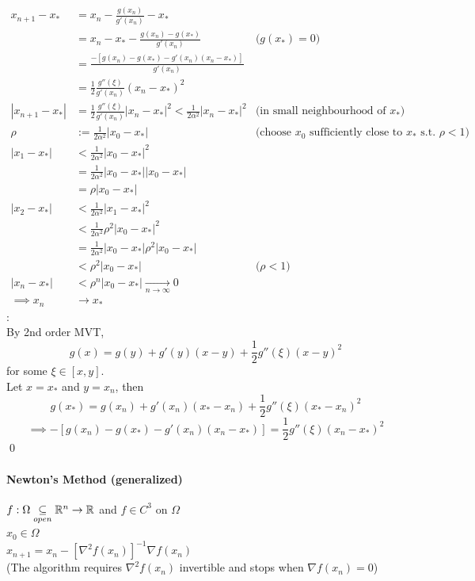 \documentclass[11pt]{article}
\begin{document}
\begin{align}
	x_{n+1} - x_* &= x_n - \frac{g(x_n)}{g'(x_n)} - x_* \\
	&= x_n - x_* - \frac{g(x_n) - g(x_*)}{g'(x_n)} &\text{($g(x_*) = 0$)}\\
	&= \frac{-[g(x_n) - g(x_*) - g'(x_n)(x_n - x_*)]}{g'(x_n)} \\
	&= \frac{1}{2}\frac{g''(\xi)}{g'(x_n)}(x_n - x_*)^2 \\
	|x_{n+1} - x_*| &= \frac{1}{2}\frac{g''(\xi)}{g'(x_n)}|x_n - x_*|^2 < \frac{1}{2\alpha^2}|x_n - x_*|^2 &\text{(in small neighbourhood of $x_*$)} \\
	\rho &:= \frac{1}{2\alpha^2} |x_0 - x_*| &\text{(choose $x_0$ sufficiently close to $x_*$ s.t. $\rho < 1$)} \\
	|x_1 - x_*| &< \frac{1}{2\alpha^2}|x_0 - x_*|^2 \\
	&= \frac{1}{2\alpha^2}|x_0 - x_*||x_0 - x_*| \\
	&= \rho|x_0 - x_*| \\
	|x_2 - x_*| &< \frac{1}{2\alpha^2}|x_1 - x_*|^2 \\
	&< \frac{1}{2\alpha^2}\rho^2|x_0 - x_*|^2 \\
	&= \frac{1}{2\alpha^2}|x_0 - x_*| \rho^2 |x_0 - x_*| \\
	&< \rho^2 |x_0 - x_*| &\text{($\rho < 1$)} \\
	|x_n - x_*| &< \rho^n |x_0 - x_*| \underset{n \rightarrow \infty}{\rightarrow} 0 \\
	\implies x_n &\rightarrow x_*
\end{align}
: \\
By 2nd order MVT,
$$g(x) = g(y) + g'(y)(x-y) + \frac{1}{2}g''(\xi) (x-y)^2$$
for some $\xi \in [x, y]$. \\
Let $x = x_*$ and $y = x_n$, then
$$g(x_*) = g(x_n) + g'(x_n)(x_* - x_n) + \frac{1}{2}g''(\xi)(x_* - x_n)^2$$
$$\implies -[g(x_n) - g(x_*) - g'(x_n)(x_n - x_*)] = \frac{1}{2}g''(\xi)(x_n - x_*)^2 $$
\qed
\paragraph{Newton's Method (generalized)}
$f: \Omega \underset{open}{\subseteq} \mathbb{R}^n \rightarrow \mathbb{R}$ and $f \in C^3$ on $\Omega$ \\
$x_0 \in \Omega$ \\
$x_{n+1} = x_n - [\nabla^2 f(x_n)]^{-1} \nabla f(x_n)$ \\
(The algorithm requires $\nabla^2 f(x_n)$ invertible and stops when $\nabla f(x_n) = 0$)
\end{document}
